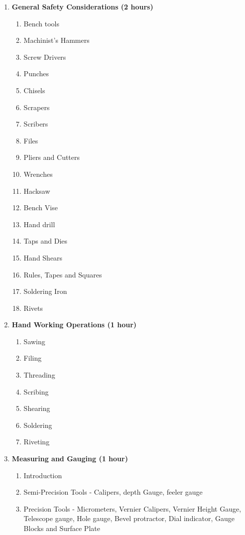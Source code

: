 \begin{enumerate}
    \item \textbf{General Safety Considerations \hfill (2 hours)}
    \begin{enumerate}
        \item Bench tools
        \item Machinist's Hammers
        \item Screw Drivers
        \item Punches
        \item Chisels
        \item Scrapers
        \item Scribers
        \item Files
        \item Pliers and Cutters
        \item Wrenches
        \item Hacksaw
        \item Bench Vise
        \item Hand drill
        \item Taps and Dies
        \item Hand Shears
        \item Rules, Tapes and Squares
        \item Soldering Iron
        \item Rivets
    \end{enumerate}
    
    \item \textbf{Hand Working Operations \hfill (1 hour)}
    \begin{enumerate}
        \item Sawing
        \item Filing
        \item Threading 
        \item Scribing
        \item Shearing
        \item Soldering
        \item Riveting
    \end{enumerate}
    
    \item \textbf{Measuring and Gauging \hfill (1 hour)}
    \begin{enumerate}
        \item Introduction
        \item Semi-Precision Tools - Calipers, depth Gauge, feeler gauge
        \item Precision Tools - Micrometers, Vernier Calipers, Vernier Height Gauge, Telescope gauge, Hole gauge, Bevel protractor, Dial indicator, Gauge Blocks and Surface Plate
    \end{enumerate}
    

\end{enumerate}
